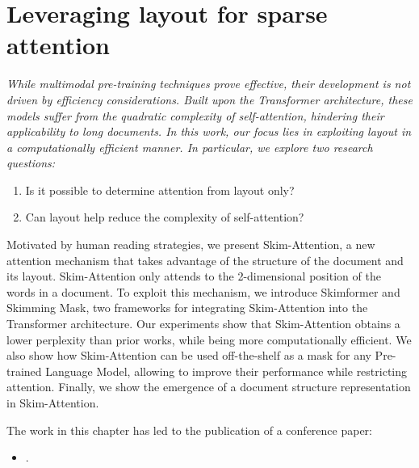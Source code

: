 
\chapter{Leveraging layout for sparse attention}
\label{chapter:skim-attention}

\renewcommand{\leftmark}{\spacedlowsmallcaps{Leveraging layout for sparse attention}}

\begin{chapabstract}
	{\em    
        While multimodal pre-training techniques prove effective, their development is not driven by efficiency considerations. Built upon the Transformer architecture, these models suffer from the quadratic complexity of self-attention, hindering their applicability to long documents. In this work, our focus lies in exploiting layout in a computationally efficient manner. In particular, we explore two research questions: 
        \begin{enumerate}
            \item Is it possible to determine attention from layout only? 
            \item Can layout help reduce the complexity of self-attention? 
        \end{enumerate}
        Motivated by human reading strategies, we present Skim-Attention, a new attention mechanism that takes advantage of the structure of the document and its layout. Skim-Attention only attends to the 2-dimensional position of the words in a document. To exploit this mechanism, we introduce Skimformer and Skimming Mask, two frameworks for integrating Skim-Attention into the Transformer architecture. Our experiments show that Skim-Attention obtains a lower perplexity than prior works, while being more computationally efficient. We also show how Skim-Attention can be used off-the-shelf as a mask for any Pre-trained Language Model, allowing to improve their performance while restricting attention. Finally, we show the emergence of a document structure representation in Skim-Attention.     
	\vspace*{5mm}
	
	The work in this chapter has led to the publication of a conference paper:}
	\begin{itemize}
		\item \small {}.
	\end{itemize}
\end{chapabstract}



